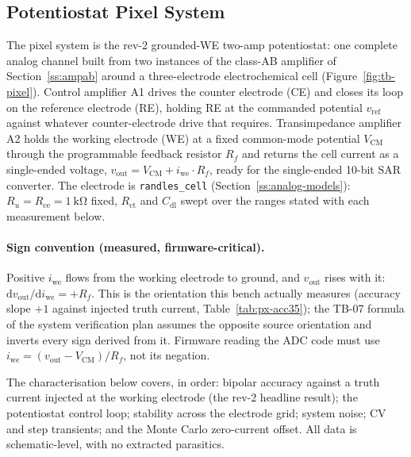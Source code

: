 %
%
%

\subsection{Potentiostat Pixel System}\label{ss:pixel}

The pixel system is the rev-2 grounded-WE two-amp potentiostat: one complete
analog channel built from two instances of the class-AB amplifier of
Section~\ref{ss:ampab} around a three-electrode electrochemical cell
(Figure~\ref{fig:tb-pixel}). Control amplifier A1 drives the counter electrode
(CE) and closes its loop on the reference electrode (RE), holding RE at the
commanded potential $v_{\mathrm{ref}}$ against whatever counter-electrode drive
that requires. Transimpedance amplifier A2 holds the working electrode (WE) at
a fixed common-mode potential $V_{\mathrm{CM}}$ through the programmable
feedback resistor $R_f$ and returns the cell current as a single-ended
voltage, $v_{\mathrm{out}} = V_{\mathrm{CM}} + i_{\mathrm{we}}\cdot R_f$, ready
for the single-ended 10-bit SAR converter. The electrode is
\texttt{randles\_cell} (Section~\ref{ss:analog-models}): $R_u = R_{\mathrm{ce}}
= \SI{1}{\kilo\ohm}$ fixed, $R_{\mathrm{ct}}$ and $C_{\mathrm{dl}}$ swept over
the ranges stated with each measurement below.

\paragraph{Sign convention (measured, firmware-critical).} Positive
$i_{\mathrm{we}}$ flows from the working electrode to ground, and
$v_{\mathrm{out}}$ rises with it: $\mathrm{d}v_{\mathrm{out}}/\mathrm{d}i_{\mathrm{we}}
= +R_f$. This is the orientation this bench actually measures (accuracy slope
$+1$ against injected truth current, Table~\ref{tab:px-acc35}); the TB-07
formula of the system verification plan assumes the opposite source
orientation and inverts every sign derived from it. Firmware reading the ADC
code must use $i_{\mathrm{we}} = (v_{\mathrm{out}} - V_{\mathrm{CM}})/R_f$, not
its negation.

The characterisation below covers, in order: bipolar accuracy against a truth
current injected at the working electrode (the rev-2 headline result); the
potentiostat control loop; stability across the electrode grid; system noise;
CV and step transients; and the Monte Carlo zero-current offset. All data is
schematic-level, with no extracted parasitics.
